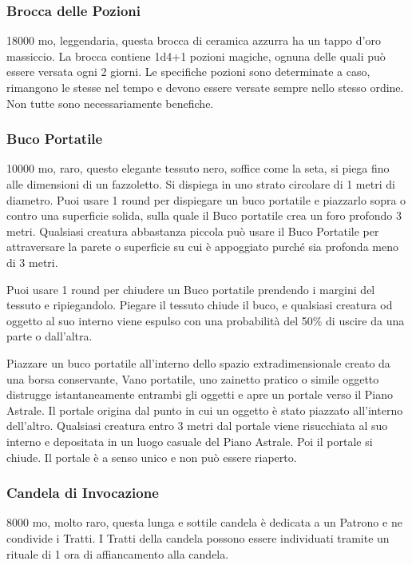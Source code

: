 \begin{multicols}{2}
\subsubsection*{Brocca delle Pozioni}
18000 mo, leggendaria, questa brocca di ceramica azzurra ha un tappo d’oro massiccio. La brocca contiene 1d4+1 pozioni magiche, ognuna delle quali può essere versata ogni 2 giorni. Le specifiche pozioni sono determinate a caso, rimangono le stesse nel tempo e devono essere versate sempre nello stesso ordine. Non tutte sono necessariamente benefiche.

\subsubsection*{Buco Portatile}
10000 mo, raro, questo elegante tessuto nero, soffice come la seta, si piega fino alle dimensioni di un fazzoletto. Si dispiega in uno strato circolare di 1 metri di diametro. Puoi usare 1 round per dispiegare un buco portatile e piazzarlo sopra o contro una superficie solida, sulla quale il Buco portatile crea un foro profondo 3 metri. Qualsiasi creatura abbastanza piccola può usare il Buco Portatile per attraversare la parete o superficie su cui è appoggiato purché sia profonda meno di 3 metri.

Puoi usare 1 round per chiudere un Buco portatile prendendo i margini del tessuto e ripiegandolo. Piegare il tessuto chiude il buco, e qualsiasi creatura od oggetto al suo interno viene espulso con una probabilità del 50\% di uscire da una parte o dall'altra.

Piazzare un buco portatile all'interno dello spazio extradimensionale creato da una borsa conservante, Vano portatile, uno zainetto pratico o simile oggetto distrugge istantaneamente entrambi gli oggetti e apre un portale verso il Piano Astrale. Il portale origina dal punto in cui un oggetto è stato piazzato all'interno dell'altro. Qualsiasi creatura entro 3 metri dal portale viene risucchiata al suo interno e depositata in un luogo casuale del Piano Astrale. Poi il portale si chiude. Il portale è a senso unico e non può essere riaperto.

\subsubsection*{Candela di Invocazione}
8000 mo, molto raro, questa lunga e sottile candela è dedicata a un Patrono e ne condivide i Tratti. I Tratti della candela possono essere individuati tramite un rituale di 1 ora di affiancamento alla candela.


\end{multicols}
